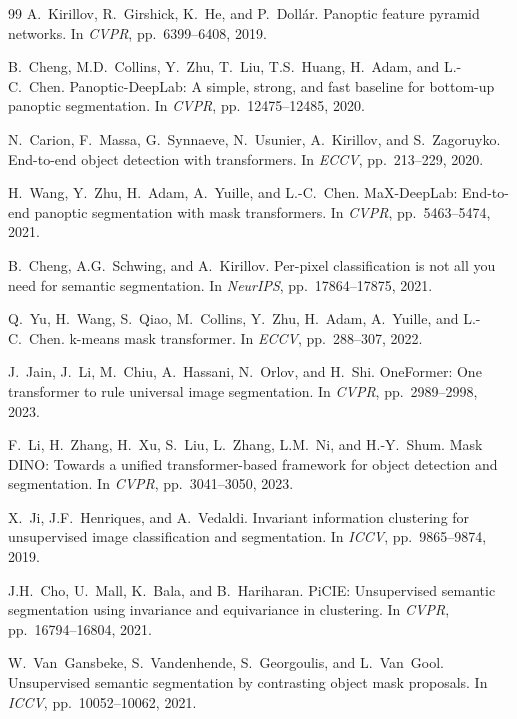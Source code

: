 \documentclass[10pt,twocolumn,letterpaper]{article}
\begin{document}
{\begin{thebibliography}{99}
A.~Kirillov, R.~Girshick, K.~He, and P.~Doll{\'a}r.
Panoptic feature pyramid networks.
In \emph{CVPR}, pp.~6399--6408, 2019.

B.~Cheng, M.D.~Collins, Y.~Zhu, T.~Liu, T.S.~Huang, H.~Adam, and L.-C.~Chen.
Panoptic-{DeepLab}: A simple, strong, and fast baseline for bottom-up panoptic segmentation.
In \emph{CVPR}, pp.~12475--12485, 2020.

N.~Carion, F.~Massa, G.~Synnaeve, N.~Usunier, A.~Kirillov, and S.~Zagoruyko.
End-to-end object detection with transformers.
In \emph{ECCV}, pp.~213--229, 2020.

H.~Wang, Y.~Zhu, H.~Adam, A.~Yuille, and L.-C.~Chen.
{MaX-DeepLab}: End-to-end panoptic segmentation with mask transformers.
In \emph{CVPR}, pp.~5463--5474, 2021.

B.~Cheng, A.G.~Schwing, and A.~Kirillov.
Per-pixel classification is not all you need for semantic segmentation.
In \emph{NeurIPS}, pp.~17864--17875, 2021.

Q.~Yu, H.~Wang, S.~Qiao, M.~Collins, Y.~Zhu, H.~Adam, A.~Yuille, and L.-C.~Chen.
k-means mask transformer.
In \emph{ECCV}, pp.~288--307, 2022.

J.~Jain, J.~Li, M.~Chiu, A.~Hassani, N.~Orlov, and H.~Shi.
{OneFormer}: One transformer to rule universal image segmentation.
In \emph{CVPR}, pp.~2989--2998, 2023.

F.~Li, H.~Zhang, H.~Xu, S.~Liu, L.~Zhang, L.M.~Ni, and H.-Y.~Shum.
Mask {DINO}: Towards a unified transformer-based framework for object detection and segmentation.
In \emph{CVPR}, pp.~3041--3050, 2023.

X.~Ji, J.F.~Henriques, and A.~Vedaldi.
Invariant information clustering for unsupervised image classification and segmentation.
In \emph{ICCV}, pp.~9865--9874, 2019.

J.H.~Cho, U.~Mall, K.~Bala, and B.~Hariharan.
{PiCIE}: Unsupervised semantic segmentation using invariance and equivariance in clustering.
In \emph{CVPR}, pp.~16794--16804, 2021.

W.~Van~Gansbeke, S.~Vandenhende, S.~Georgoulis, and L.~Van~Gool.
Unsupervised semantic segmentation by contrasting object mask proposals.
In \emph{ICCV}, pp.~10052--10062, 2021.


\end{thebibliography}}
\end{document}
